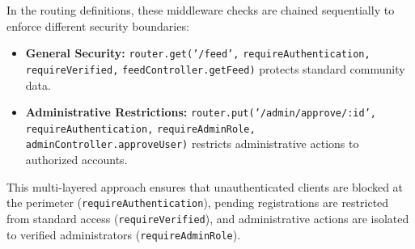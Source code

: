 In the routing definitions, these middleware checks are chained sequentially to enforce different security boundaries:
\begin{itemize}
    \item \textbf{General Security:} \texttt{router.get('/feed',} \allowbreak \texttt{requireAuthentication,} \allowbreak \texttt{requireVerified,} \allowbreak \texttt{feedController.getFeed)} protects standard community data.
    \item \textbf{Administrative Restrictions:} \texttt{router.put('/admin/approve/:id',} \allowbreak \texttt{requireAuthentication,} \allowbreak \texttt{requireAdminRole,} \allowbreak \texttt{adminController.approveUser)} restricts administrative actions to authorized accounts.
\end{itemize}

This multi-layered approach ensures that unauthenticated clients are blocked at the perimeter (\texttt{requireAuthentication}), pending registrations are restricted from standard access (\texttt{requireVerified}), and administrative actions are isolated to verified administrators (\texttt{requireAdminRole}).